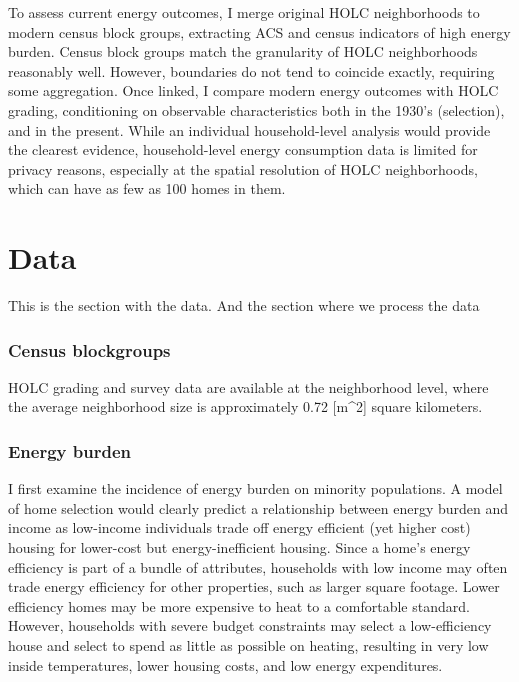 \documentclass[
]{article}
\begin{document}
To assess current energy outcomes, I merge original HOLC neighborhoods
to modern census block groups, extracting ACS and census indicators of
high energy burden. Census block groups match the granularity of HOLC
neighborhoods reasonably well. However, boundaries do not tend to
coincide exactly, requiring some aggregation. Once linked, I compare
modern energy outcomes with HOLC grading, conditioning on observable
characteristics both in the 1930's (selection), and in the present.
While an individual household-level analysis would provide the clearest
evidence, household-level energy consumption data is limited for privacy
reasons, especially at the spatial resolution of HOLC neighborhoods,
which can have as few as 100 homes in them.

\hypertarget{section}{%
\paragraph{}\label{section}}

\hypertarget{data}{%
\section{Data}\label{data}}

This is the section with the data. And the section where we process the
data

\hypertarget{census-blockgroups}{%
\subsubsection{Census blockgroups}\label{census-blockgroups}}

HOLC grading and survey data are available at the neighborhood level,
where the average neighborhood size is approximately 0.72 {[}m\^{}2{]}
square kilometers.

\hypertarget{energy-burden}{%
\subsubsection{Energy burden}\label{energy-burden}}

I first examine the incidence of energy burden on minority populations.
A model of home selection would clearly predict a relationship between
energy burden and income as low-income individuals trade off energy
efficient (yet higher cost) housing for lower-cost but
energy-inefficient housing. Since a home's energy efficiency is part of
a bundle of attributes, households with low income may often trade
energy efficiency for other properties, such as larger square footage.
Lower efficiency homes may be more expensive to heat to a comfortable
standard. However, households with severe budget constraints may select
a low-efficiency house and select to spend as little as possible on
heating, resulting in very low inside temperatures, lower housing costs,
and low energy expenditures.
\end{document}
